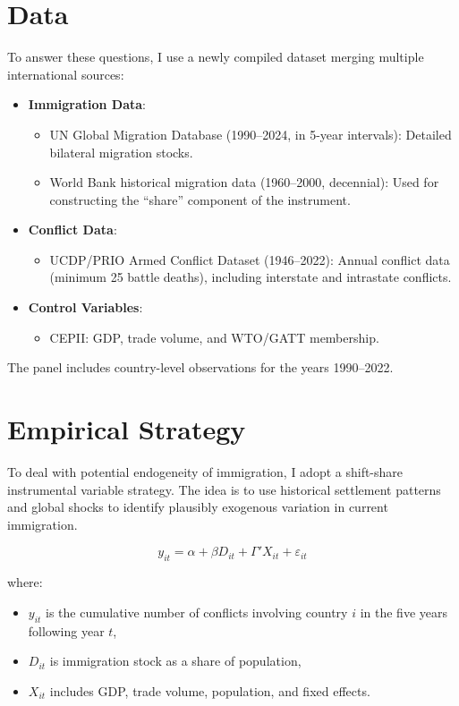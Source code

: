 \documentclass[12pt]{article}
\begin{document}
\section*{Data}

To answer these questions, I use a newly compiled dataset merging multiple international sources:

\begin{itemize}
    \item \textbf{Immigration Data}:
    \begin{itemize}
        \item UN Global Migration Database (1990–2024, in 5-year intervals): Detailed bilateral migration stocks.
        \item World Bank historical migration data (1960–2000, decennial): Used for constructing the ``share'' component of the instrument.
    \end{itemize}
    \item \textbf{Conflict Data}:
    \begin{itemize}
        \item UCDP/PRIO Armed Conflict Dataset (1946–2022): Annual conflict data (minimum 25 battle deaths), including interstate and intrastate conflicts.
    \end{itemize}
    \item \textbf{Control Variables}:
    \begin{itemize}
        \item CEPII: GDP, trade volume, and WTO/GATT membership.
    \end{itemize}
\end{itemize}

The panel includes country-level observations for the years 1990–2022.

\section*{Empirical Strategy}

To deal with potential endogeneity of immigration, I adopt a shift-share instrumental variable strategy. The idea is to use historical settlement patterns and global shocks to identify plausibly exogenous variation in current immigration.

\[
y_{it} = \alpha + \beta D_{it} + \Gamma' X_{it} + \varepsilon_{it}
\]

where:
\begin{itemize}
    \item $y_{it}$ is the cumulative number of conflicts involving country $i$ in the five years following year $t$,
    \item $D_{it}$ is immigration stock as a share of population,
    \item $X_{it}$ includes GDP, trade volume, population, and fixed effects.
\end{itemize}
\end{document}
